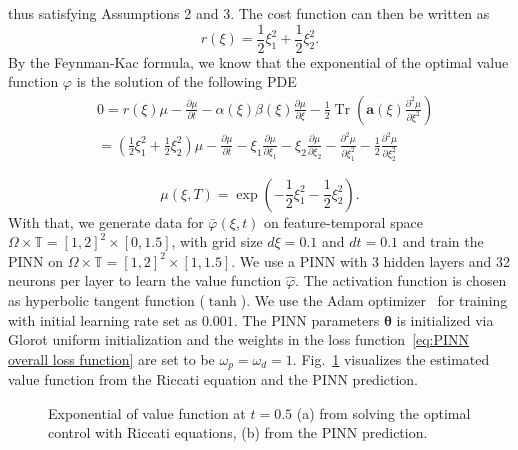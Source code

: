 \documentclass[letterpaper]{article} %
\begin{document}
thus satisfying Assumptions 2 and 3.
The cost function can then be written as
\begin{equation} \label{eq: r_xi}
    r(\xi) = \frac{1}{2}\xi_1^2 + \frac{1}{2}\xi_2^2.
\end{equation}
By the Feynman-Kac formula, we know that the exponential of the optimal value function $\varphi$ is the solution of the following PDE
\begin{align}
    & 0 = r(\xi)\mu 
    - \frac{\partial \mu}{\partial t} - 
    \alpha(\xi) \beta(\xi) \frac{\partial \mu}{\partial \xi} - \frac{1}{2} \operatorname{Tr} \left(
    \mathbf{a}(\xi) \frac{\partial^2 \mu}{\partial \xi^2} \right) \\
    & = (\frac{1}{2}\xi_1^2 + \frac{1}{2}\xi_2^2)\mu - \frac{\partial \mu}{\partial t} - \xi_1 \frac{\partial \mu}{\partial \xi_1} - \xi_2 \frac{\partial \mu}{\partial \xi_2} - \frac{\partial^2 \mu}{\partial \xi_1^2} - \frac{1}{2} \frac{\partial^2 \mu}{\partial \xi_2^2} \nonumber
\end{align}

\begin{equation}
    \mu(\xi, T) = \exp(- \frac{1}{2}\xi_1^2 - \frac{1}{2}\xi_2^2).
\end{equation}
With that, we generate data for $\bar \varphi(\xi,t)$ on feature-temporal space $\Omega \times \mathbb{T} = [1,2]^2 \times [0,1.5]$, with grid size $d\xi = 0.1$ and $dt = 0.1$ and train the PINN on $\Omega \times \mathbb{T} = [1,2]^2 \times [1,1.5]$. 
We use a PINN with 3 hidden layers and 32 neurons per layer to learn the value function $\hat \varphi$. The activation function is chosen as hyperbolic tangent function ($\tanh$). We use the Adam optimizer~\cite{kingma2014adam} for training with initial learning rate set as $0.001$. The PINN parameters $\boldsymbol\theta$ is initialized via Glorot uniform initialization and the weights in the loss function~\eqref{eq:PINN overall loss function} are set to be $\omega_p = \omega_d = 1$. Fig.~\ref{fig:value_func_visual} visualizes the estimated value function from the Riccati equation and the PINN prediction.

\begin{figure}[t]
  \begin{subfigure}{0.45\columnwidth}
  
  \caption{}
  \end{subfigure}
  \hspace{3pt}
  \begin{subfigure}{0.45\columnwidth}
  
  \caption{} 
  \end{subfigure} 
  \caption{Exponential of value function at $t=0.5$ (a) from solving the optimal control with Riccati equations, (b) from the PINN prediction.}
  \label{fig:value_func_visual}
\end{figure}
\end{document}
